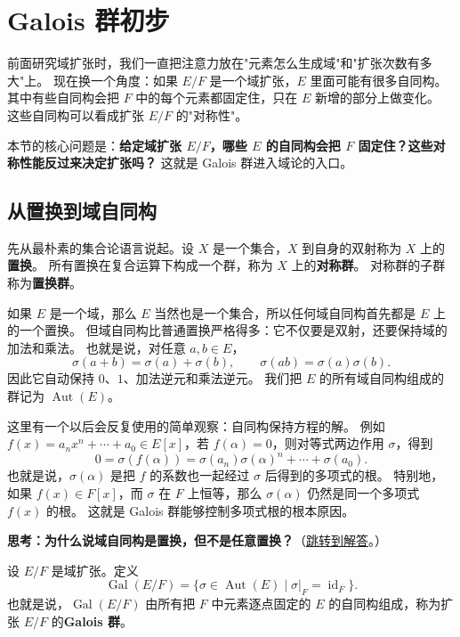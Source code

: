 \section{Galois 群初步}\label{sec:galois-group}

前面研究域扩张时，我们一直把注意力放在"元素怎么生成域"和"扩张次数有多大"上。
现在换一个角度：如果 $E/F$ 是一个域扩张，$E$ 里面可能有很多自同构。
其中有些自同构会把 $F$ 中的每个元素都固定住，只在 $E$ 新增的部分上做变化。
这些自同构可以看成扩张 $E/F$ 的"对称性"。

本节的核心问题是：\textbf{给定域扩张 $E/F$，哪些 $E$ 的自同构会把 $F$ 固定住？这些对称性能反过来决定扩张吗？}
这就是 Galois 群进入域论的入口。

\subsection{从置换到域自同构}

先从最朴素的集合论语言说起。设 $X$ 是一个集合，$X$ 到自身的双射称为 $X$ 上的\textbf{置换}。
所有置换在复合运算下构成一个群，称为 $X$ 上的\textbf{对称群}。
对称群的子群称为\textbf{置换群}。

如果 $E$ 是一个域，那么 $E$ 当然也是一个集合，所以任何域自同构首先都是 $E$ 上的一个置换。
但域自同构比普通置换严格得多：它不仅要是双射，还要保持域的加法和乘法。
也就是说，对任意 $a,b\in E$，
\[
\sigma(a+b)=\sigma(a)+\sigma(b),\qquad \sigma(ab)=\sigma(a)\sigma(b).
\]
因此它自动保持 $0$、$1$、加法逆元和乘法逆元。
我们把 $E$ 的所有域自同构组成的群记为 $\operatorname{Aut}(E)$。

这里有一个以后会反复使用的简单观察：自同构保持方程的解。
例如 $f(x)=a_nx^n+\cdots+a_0\in E[x]$，若 $f(\alpha)=0$，则对等式两边作用 $\sigma$，得到
\[
0=\sigma(f(\alpha))
=\sigma(a_n)\sigma(\alpha)^n+\cdots+\sigma(a_0).
\]
也就是说，$\sigma(\alpha)$ 是把 $f$ 的系数也一起经过 $\sigma$ 后得到的多项式的根。
特别地，如果 $f(x)\in F[x]$，而 $\sigma$ 在 $F$ 上恒等，那么 $\sigma(\alpha)$ 仍然是同一个多项式 $f(x)$ 的根。
这就是 Galois 群能够控制多项式根的根本原因。

\hypertarget{q:galois-automorphism-vs-permutation}{}
\medskip
\noindent\textbf{思考：为什么说域自同构是置换，但不是任意置换？}（\hyperlink{ans:galois-automorphism-vs-permutation}{跳转到解答}。）
\medskip

\begin{definition}[Galois 群]\label{def:galois-group}
设 $E/F$ 是域扩张。定义
\[
\operatorname{Gal}(E/F)
=\{\sigma\in\operatorname{Aut}(E)\mid \sigma|_F=\operatorname{id}_F\}.
\]
也就是说，$\operatorname{Gal}(E/F)$ 由所有把 $F$ 中元素逐点固定的 $E$ 的自同构组成，称为扩张 $E/F$ 的\textbf{Galois 群}。
\end{definition}

